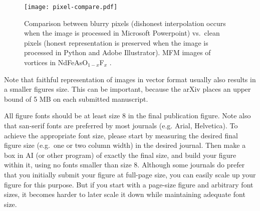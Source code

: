 \documentclass[aps,prb,twocolumn,superscriptaddress,floatfix,longbibliography]{revtex4-2}
\begin{document}
\begin{figure}[h]
    \texttt{[image: pixel-compare.pdf]}
    \caption{Comparison between blurry pixels (dishonest interpolation occurs when the image is processed in Microsoft Powerpoint) vs.\ clean pixels (honest representation is preserved when the image is processed in Python and Adobe Illustrator). MFM images of vortices in NdFeAsO$_{1-x}$F$_x$ \cite{ZhangPRB2015}.}
     \label{fig:pixels}
\end{figure}

Note that faithful representation of images in vector format usually also results in a smaller figures size. This can be important, because the arXiv places an upper bound of 5 MB on each submitted manuscript.

All figure fonts should be at least size 8 in the final publication figure. Note also that san-serif fonts are preferred by most journals (e.g. Arial, Helvetica). To achieve the appropriate font size, please start by measuring the desired final figure size (e.g.\ one or two column width) in the desired journal. Then make a box in AI (or other program) of exactly the final size, and build your figure within it, using no fonts smaller than size 8. Although some journals do prefer that you initially submit your figure at full-page size, you can easily scale up your figure for this purpose. But if you start with a page-size figure and arbitrary font sizes, it becomes harder to later scale it down while maintaining adequate font size.
\end{document}
